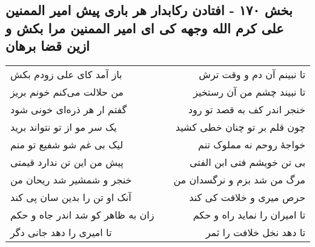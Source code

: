\begin{center}
\section*{بخش ۱۷۰ - افتادن رکابدار هر باری پیش امیر الممنین علی کرم الله وجهه کی ای امیر الممنین مرا بکش و ازین قضا برهان}
\label{sec:sh170}
\begin{longtable}{l p{0.5cm} r}
باز آمد کای علی زودم بکش
&&
تا نبینم آن دم و وقت ترش
\\
من حلالت می‌کنم خونم بریز
&&
تا نبیند چشم من آن رستخیز
\\
گفتم ار هر ذره‌ای خونی شود
&&
خنجر اندر کف به قصد تو رود
\\
یک سر مو از تو نتواند برید
&&
چون قلم بر تو چنان خطی کشید
\\
لیک بی غم شو شفیع تو منم
&&
خواجهٔ روحم نه مملوک تنم
\\
پیش من این تن ندارد قیمتی
&&
بی تن خویشم فتی ابن الفتی
\\
خنجر و شمشیر شد ریحان من
&&
مرگ من شد بزم و نرگسدان من
\\
آنک او تن را بدین سان پی کند
&&
حرص میری و خلافت کی کند
\\
زان به ظاهر کو شد اندر جاه و حکم
&&
تا امیران را نماید راه و حکم
\\
تا امیری را دهد جانی دگر
&&
تا دهد نخل خلافت را ثمر
\\
\end{longtable}
\end{center}
